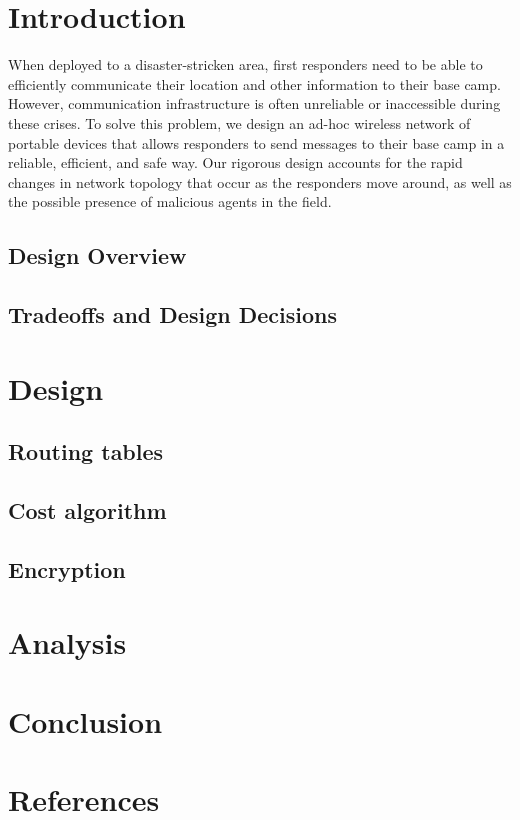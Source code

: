 \documentclass[letterpaper]{article}
\begin{document}
\section{Introduction}

When deployed to a disaster-stricken area, first responders need to be able to efficiently communicate their location and other 
information to their base camp. However, communication infrastructure is often unreliable or inaccessible during these crises. 
To solve this problem, we design an ad-hoc wireless network of portable devices that allows responders to send messages to their 
base camp in a reliable, efficient, and safe way. Our rigorous design accounts for the rapid changes in network topology that 
occur as the responders move around, as well as the possible presence of malicious agents in the field. 

\subsection{Design Overview}

\subsection{Tradeoffs and Design Decisions}

\section{Design}

\subsection{Routing tables}

\subsection{Cost algorithm}

\subsection{Encryption}

\section{Analysis}

\section{Conclusion}

\section{References}
\end{document}
